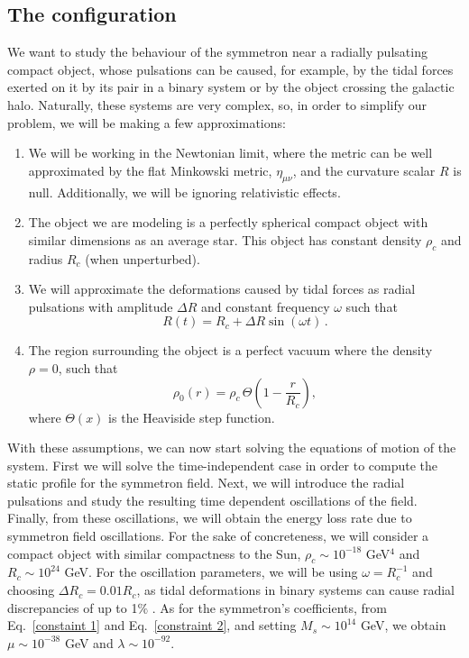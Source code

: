 \documentclass[nofootinbib,twocolumn]{revtex4}
\begin{document}
\subsection{The configuration}

We want to study the behaviour of the symmetron near a radially pulsating compact object, whose pulsations can be caused, for example, by the tidal forces exerted on it by its pair in a binary system or by the object crossing the galactic halo. Naturally, these systems are very complex, so, in order to simplify our problem, we will be making a few approximations: 

\begin{enumerate}
\item We will be working in the Newtonian limit, where the metric can be well approximated by the flat Minkowski metric, $\eta_{\mu\nu}$, and the curvature scalar $R$ is null. Additionally, we will be ignoring relativistic effects.
\item The object we are modeling is a perfectly spherical compact object with similar dimensions as an average star. This object has constant density $\rho_c$ and radius $R_c$ (when unperturbed).
\item We will approximate the deformations caused by tidal forces as radial pulsations with amplitude $\Delta R$ and constant frequency $\omega $ such that 
\begin{equation}
R(t) = R_c + \Delta R \sin(\omega t)\,.    
\end{equation}
\item The region surrounding the object is a perfect vacuum where the density $\rho = 0$, such that
\begin{equation}
\rho_0(r) = \rho_c\, \Theta\left(1-\frac{r}{R_c}\right),    
\end{equation}  
where $\Theta(x)$ is the Heaviside step function.
\end{enumerate}

With these assumptions, we can now start solving the equations of motion of the system. First we will solve the time-independent case in order to compute the static profile for the symmetron field. Next, we will introduce the radial pulsations and study the resulting time dependent oscillations of the field. Finally, from these oscillations, we will obtain the energy loss rate due to symmetron field oscillations. For the sake of concreteness, we will consider a compact object with similar compactness to the Sun,
$\rho_c \sim 10^{-18}$ GeV$^4$ and $R_c  \sim 10^{24}$ GeV. For the oscillation parameters, we will be using $\omega ={R^{-1}_c}$ and choosing $\Delta R_c = 0.01R_c$, as tidal deformations in binary systems can cause radial discrepancies of up to 1$\%$ \cite{Fabry_2022}. As for the symmetron's coefficients, from Eq.~\eqref{constaint 1} and Eq.~\eqref{constraint 2}, and setting $M_s \sim 10^{14}$ GeV, we obtain $\mu \sim 10^{-38}$ GeV and $\lambda \sim 10^{-92}$.
\end{document}

